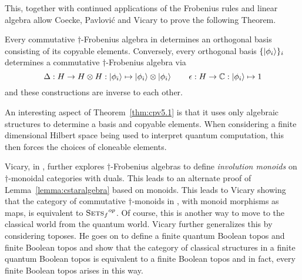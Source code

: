 This, together with continued applications of the Frobenius rules and linear algebra allow Coecke,
Pavlovi\'c and Vicary to prove the following Theorem.
\begin{theorem}\label{thm:cpv5.1}
  Every commutative $\dagger$-Frobenius algebra in \fdh determines an orthogonal basis consisting
  of its copyable elements. Conversely, every orthogonal basis $\{\left\vert{\phi_{i}}\right\rangle\}_{i}$ determines
  a commutative $\dagger$-Frobenius algebra via \[\Delta:H\to H\otimes H: \left\vert{\phi_{i}}\right\rangle\mapsto
  \left\vert{\phi_{i}}\right\rangle \otimes \left\vert{\phi_{i}}\right\rangle\qquad\epsilon : H\to \mathbb{C} : \left\vert{\phi_{i}}\right\rangle \mapsto 1\] and these
  constructions are inverse to each other.
\end{theorem}

An interesting aspect of Theorem~\ref{thm:cpv5.1} is that it uses only algebraic structures to
determine a basis and copyable elements. When considering a finite dimensional Hilbert space being
used to interpret quantum computation, this then forces the choices of cloneable elements.

\begin{remark}
  Vicary, in \cite{vicary2011categorical}, further explores $\dagger$-Frobenius algebras to define
  \emph{involution monoids} on $\dagger$-monoidal categories with duals. This leads to an alternate
  proof of Lemma~\ref{lemma:cstaralgebra} based on monoids. This leads to Vicary showing that
  the category of commutative $\dagger$-monoids in \fdh, with monoid morphisms as maps, is equivalent
  to ${\textsc{Sets}_f}^{op}$. Of course, this is another way to move to the classical world from
  the quantum world.  Vicary further generalizes this by considering
  toposes\cite{mclarty1992elementary}. He goes on to define a finite quantum Boolean topos and
  finite Boolean topos and show that the category of classical structures in a finite quantum
  Boolean topos is equivalent to a finite Boolean topos and in fact, every finite Boolean topos
  arises in this way.
\end{remark}

